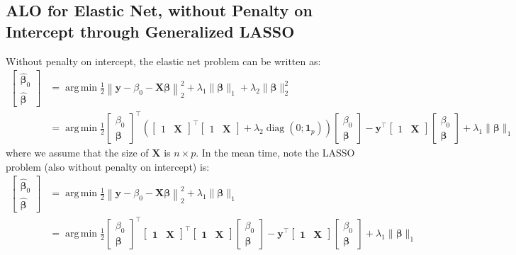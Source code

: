 \documentclass[11pt]{article}
\newcommand{\by}{\bm{y}}
\newcommand{\bX}{\bm{X}}
\newcommand{\bbeta}{\bm{\beta}}
\newcommand{\bOne}{\bm{1}}
\DeclareMathOperator{\diag}{diag}
\DeclareMathOperator*{\argmin}{arg\,min}
\begin{document}
\subsection{ALO for Elastic Net, without Penalty on Intercept through Generalized LASSO}
Without penalty on intercept, the elastic net problem can be written as:
\begin{align*}
\begin{bmatrix}
\hat{\bbeta}_0 \\
\hat{\bbeta}
\end{bmatrix} &= \argmin\frac{1}{2} \left\|\by - \beta_0 - \bX\bbeta\right\|_2^2 + \lambda_1 \|\bbeta\|_1 + \lambda_2 \|\bbeta\|_2^2 \\
&= \argmin\frac{1}{2} 
\begin{bmatrix}
\beta_0 \\
\bbeta
\end{bmatrix}^\top \left(
\begin{bmatrix}
1 & \bX
\end{bmatrix}^\top
\begin{bmatrix}
1 & \bX
\end{bmatrix} + 
\lambda_2 \diag(0; \bOne_p)
\right)
\begin{bmatrix} 
\beta_0 \\
\bbeta
\end{bmatrix} - \by^\top
\begin{bmatrix}
1 & \bX
\end{bmatrix} 
\begin{bmatrix}
\beta_0 \\
\bbeta
\end{bmatrix}   + \lambda_1 \|\bbeta\|_1
\end{align*}
where we assume that the size of $\bX$ is $n \times p$. In the mean time, note the LASSO problem (also without penalty on intercept) is:
\begin{align*}
\begin{bmatrix}
\hat{\bbeta}_0 \\
\hat{\bbeta}
\end{bmatrix} &= \argmin\frac{1}{2} \left\|\by - \beta_0 - \bX\bbeta\right\|_2^2 + \lambda_1 \|\bbeta\|_1 \\
&= \argmin\frac{1}{2} 
\begin{bmatrix}
\beta_0 \\
\bbeta
\end{bmatrix}^\top 
\begin{bmatrix}
\bOne & \bX
\end{bmatrix}^\top
\begin{bmatrix}
\bOne & \bX
\end{bmatrix} 
\begin{bmatrix} 
\beta_0 \\
\bbeta
\end{bmatrix} - \by^\top
\begin{bmatrix}
\bOne & \bX
\end{bmatrix} 
\begin{bmatrix}
\beta_0 \\
\bbeta
\end{bmatrix} +  \lambda_1 \|\bbeta\|_1
\end{align*}
\end{document}
